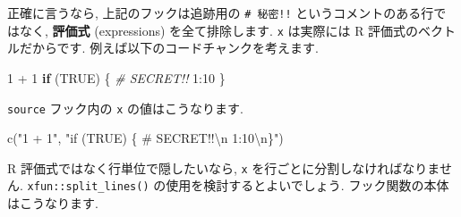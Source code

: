 \documentclass[
  11pt,
  lualatex,ja=standard,jafont=noto]{bxjsreport}
\newenvironment{Shaded}{\begin{snugshade}}{\end{snugshade}}
\newcommand{\AttributeTok}[1]{\textcolor[rgb]{0.77,0.63,0.00}{#1}}
\newcommand{\CommentTok}[1]{\textcolor[rgb]{0.56,0.35,0.01}{\textit{#1}}}
\newcommand{\ConstantTok}[1]{\textcolor[rgb]{0.00,0.00,0.00}{#1}}
\newcommand{\ControlFlowTok}[1]{\textcolor[rgb]{0.13,0.29,0.53}{\textbf{#1}}}
\newcommand{\DecValTok}[1]{\textcolor[rgb]{0.00,0.00,0.81}{#1}}
\newcommand{\FunctionTok}[1]{\textcolor[rgb]{0.00,0.00,0.00}{#1}}
\newcommand{\NormalTok}[1]{#1}
\newcommand{\OtherTok}[1]{\textcolor[rgb]{0.56,0.35,0.01}{#1}}
\newcommand{\SpecialCharTok}[1]{\textcolor[rgb]{0.00,0.00,0.00}{#1}}
\newcommand{\StringTok}[1]{\textcolor[rgb]{0.31,0.60,0.02}{#1}}
\begin{document}
\begin{Shaded}
\end{Shaded}

正確に言うなら, 上記のフックは追跡用の \texttt{\# 秘密!!} というコメントのある行ではなく, \textbf{評価式} (expressions) を全て排除します. \texttt{x} は実際には R 評価式のベクトルだからです. 例えば以下のコードチャンクを考えます.

\begin{Shaded}
\begin{Highlighting}[numbers=left,,]
\DecValTok{1} \SpecialCharTok{+} \DecValTok{1}
\ControlFlowTok{if}\NormalTok{ (}\ConstantTok{TRUE}\NormalTok{) \{}
  \CommentTok{\# SECRET!!}
  \DecValTok{1}\SpecialCharTok{:}\DecValTok{10}
\NormalTok{\}}
\end{Highlighting}
\end{Shaded}

\texttt{source} フック内の \texttt{x} の値はこうなります.

\begin{Shaded}
\begin{Highlighting}[numbers=left,,]
\FunctionTok{c}\NormalTok{(}\StringTok{"1 + 1"}\NormalTok{, }\StringTok{"if (TRUE) \{ \# SECRET!!}\SpecialCharTok{\textbackslash{}n}\StringTok{  1:10}\SpecialCharTok{\textbackslash{}n}\StringTok{\}"}\NormalTok{)}
\end{Highlighting}
\end{Shaded}

R 評価式ではなく行単位で隠したいなら, \texttt{x} を行ごとに分割しなければなりません. \texttt{xfun::split\_lines()} の使用を検討するとよいでしょう. フック関数の本体はこうなります.

\begin{Shaded}
\end{Shaded}
\end{document}
